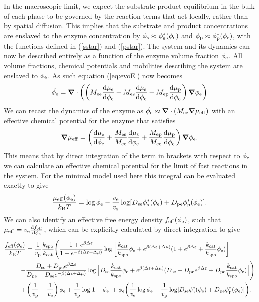 In the macroscopic limit, we expect the substrate-product equilibrium in the bulk of each phase to be governed by the reaction terms that act locally, rather than by spatial diffusion. This implies that the substrate and product concentrations are enslaved to the enzyme concentration by $\phi_{\mathrm{s}} \approx \phi_{\mathrm{s}}^*(\phi_{\mathrm{e}})$ and $\phi_{\mathrm{p}} \approx \phi_{\mathrm{p}}^*(\phi_{\mathrm{e}})$, with the functions defined in (\ref{sstar}) and (\ref{pstar}). The system and its dynamics can now be described entirely as a function of the enzyme volume fraction $\phi_{\mathrm{e}}$. All volume fractions, chemical potentials and mobilities describing the system are enslaved to $\phi_{\mathrm{e}}$. As such equation (\ref{eq:evoE}) now becomes
\begin{equation}
    \dot{\phi_{\mathrm{e}}} = \bm{\nabla} \cdot \left(\left(M_{\mathrm{ee}}\frac{\mathrm{d}\mu_{\mathrm{e}}}{\mathrm{d}\phi_{\mathrm{e}}} + M_{\mathrm{es}}\frac{\mathrm{d}\mu_{\mathrm{s}}}{\mathrm{d}\phi_{\mathrm{e}}} + M_{\mathrm{ep}}\frac{\mathrm{d}\mu_{\mathrm{p}}}{\mathrm{d}\phi_{\mathrm{e}}}\right)\bm{\nabla}\phi_{\mathrm{e}}\right)
\end{equation}
We can recast the dynamics of the enzyme as $\dot{\phi_{\mathrm{e}}}\approx \bm{\nabla} \cdot (M_{\mathrm{ee}}\bm{\nabla}\mu_\mathrm{eff})$ with an effective chemical potential for the enzyme that satisfies
\begin{equation}
    \bm{\nabla}\mu_\mathrm{eff} = \left(\frac{\text{d}\mu_{\mathrm{e}}}{\text{d}\phi_{\mathrm{e}}} + \frac{M_{\mathrm{es}}}{M_{\mathrm{ee}}}\frac{\text{d}\mu_{\mathrm{s}}}{\text{d}\phi_{\mathrm{e}}} + \frac{M_{\mathrm{ep}}}{M_{\mathrm{ee}}}\frac{\text{d}\mu_{\mathrm{p}}}{\text{d}\phi_{\mathrm{e}}}\right)\bm{\nabla}\phi_{\mathrm{e}}.
\end{equation}
This means that by direct integration of the term in brackets with respect to $\phi_{\mathrm{e}}$ we can calculate an effective chemical potential for the limit of fast reactions in the system. For the minimal model used here this integral can be evaluated exactly to give
\begin{equation}
    \frac{\mu_\mathrm{eff}(\phi_{\mathrm{e}})}{k_{\rm B} T} =  \log \phi_{\mathrm{e}} - \frac{v_{\mathrm{e}}}{v_{\mathrm{s}}} \log[D_{\mathrm{se}} \phi_{\mathrm{s}}^* (\phi_{\mathrm{e}}) + D_{\mathrm{pe}} \phi_{\mathrm{p}}^*(\phi_{\mathrm{e}})].
\end{equation}
We can also identify an effective free energy density $f_\mathrm{eff}(\phi_{\mathrm{e}})$, such that $\mu_\mathrm{eff}=v_{\mathrm{e}}\frac{\mathrm{d} f_\mathrm{eff}}{\mathrm{d} \phi_{\mathrm{e}}}$, which can be explicitly calculated by direct integration to give
\begin{equation}
\begin{split}
    \frac{f_\mathrm{eff}(\phi_{\mathrm{e}})}{k_{\rm B} T} &= \frac{1}{v_{\mathrm{p}}}\frac{k_{\mathrm{spo}}}{k_{\mathrm{cat}}}\Bigg(\frac{1+e^{\beta \Delta \varepsilon}}{1+e^{-\beta (\Delta \varepsilon + \Delta \mu)}}\log\left[\frac{k_{\mathrm{cat}}}{k_{\mathrm{spo}}}\phi_{\mathrm{e}} + e^{\beta (\Delta \varepsilon + \Delta \mu)}(1+e^{\beta \Delta \varepsilon} + \frac{k_{\mathrm{cat}}}{k_{\mathrm{spo}}}\phi_{\mathrm{e}})\right] \\
    -& \frac{D_{\mathrm{se}}+D_{\mathrm{pe}} e^{\beta \Delta \varepsilon}}{D_{\mathrm{pe}}+D_{\mathrm{se}} e^{-\beta (\Delta \varepsilon + \Delta \mu)}}\log\Big[D_{\mathrm{se}}\frac{k_{\mathrm{cat}}}{k_{\mathrm{spo}}}\phi_{\mathrm{e}} + e^{\beta (\Delta \varepsilon + \Delta \mu)}(D_{\mathrm{se}}+D_{\mathrm{pe}} e^{\beta \Delta \varepsilon} + D_{\mathrm{pe}} \frac{k_{\mathrm{cat}}}{k_{\mathrm{spo}}}\phi_{\mathrm{e}})\Big]\Bigg) \\
    +&\left(\frac{1}{v_{\mathrm{p}}}-\frac{1}{v_{\mathrm{e}}}\right)\phi_{\mathrm{e}} + \frac{1}{v_{\mathrm{p}}}\log[1-\phi_{\mathrm{e}}] + \phi_{\mathrm{e}}\bigg(\frac{1}{v_{\mathrm{e}}}\log\phi_{\mathrm{e}} - \frac{1}{v_{\mathrm{p}}} \log[D_{\mathrm{se}}\phi_{\mathrm{s}}^*(\phi_{\mathrm{e}})+D_{\mathrm{pe}}\phi_{\mathrm{p}}^*(\phi_{\mathrm{e}})]\bigg).
\end{split}
\end{equation}

